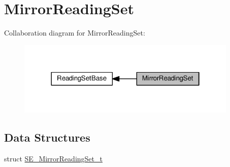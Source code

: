 \hypertarget{group__MirrorReadingSet}{}\section{Mirror\+Reading\+Set}
\label{group__MirrorReadingSet}
Collaboration diagram for Mirror\+Reading\+Set\+:\nopagebreak
\begin{figure}[H]
\begin{center}
\leavevmode
\includegraphics[width=298pt]{group__MirrorReadingSet}
\end{center}
\end{figure}
\subsection*{Data Structures}
\begin{DoxyCompactItemize}
\item 
struct \hyperlink{structSE__MirrorReadingSet__t}{S\+E\+\_\+\+Mirror\+Reading\+Set\+\_\+t}
\end{DoxyCompactItemize}
